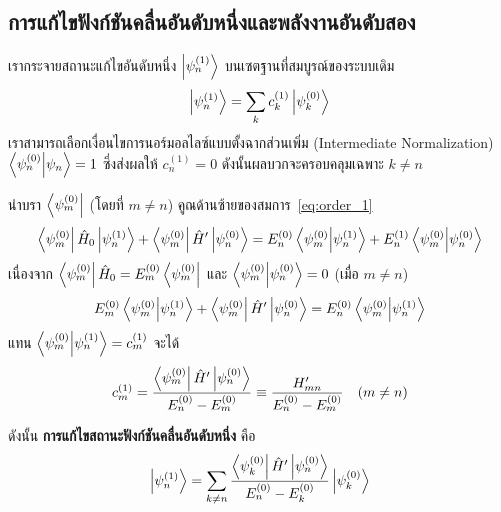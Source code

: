 \subsection{การแก้ไขฟังก์ชันคลื่นอันดับหนึ่งและพลังงานอันดับสอง}
เรากระจายสถานะแก้ไขอันดับหนึ่ง $\ket{\psi_n^{(1)}}$ บนเซตฐานที่สมบูรณ์ของระบบเดิม
\begin{equation}
\ket{\psi_n^{(1)}} = \sum_k c_k^{(1)} \ket{\psi_k^{(0)}}
\label{eq:psi1_expansion}
\end{equation}
เราสามารถเลือกเงื่อนไขการนอร์มอลไลซ์แบบตั้งฉากส่วนเพิ่ม (Intermediate Normalization) $\braket{\psi_n^{(0)}}{\psi_n} = 1$ ซึ่งส่งผลให้ $c_n^{(1)} = 0$ ดังนั้นผลบวกจะครอบคลุมเฉพาะ $k \neq n$

นำบรา $\bra{\psi_m^{(0)}}$ (โดยที่ $m \neq n$) คูณด้านซ้ายของสมการ~\eqref{eq:order_1}
\begin{equation}
\bra{\psi_m^{(0)}} \hat{H}_0 \ket{\psi_n^{(1)}} + \bra{\psi_m^{(0)}} \hat{H}' \ket{\psi_n^{(0)}} = E_n^{(0)} \braket{\psi_m^{(0)}}{\psi_n^{(1)}} + E_n^{(1)} \braket{\psi_m^{(0)}}{\psi_n^{(0)}}
\end{equation}
เนื่องจาก $\bra{\psi_m^{(0)}}\hat{H}_0 = E_m^{(0)}\bra{\psi_m^{(0)}}$ และ $\braket{\psi_m^{(0)}}{\psi_n^{(0)}} = 0$ (เมื่อ $m \neq n$)
\begin{equation}
E_m^{(0)} \braket{\psi_m^{(0)}}{\psi_n^{(1)}} + \bra{\psi_m^{(0)}} \hat{H}' \ket{\psi_n^{(0)}} = E_n^{(0)} \braket{\psi_m^{(0)}}{\psi_n^{(1)}}
\end{equation}
แทน $\braket{\psi_m^{(0)}}{\psi_n^{(1)}} = c_m^{(1)}$ จะได้
\begin{equation}
c_m^{(1)} = \frac{\bra{\psi_m^{(0)}} \hat{H}' \ket{\psi_n^{(0)}}}{E_n^{(0)} - E_m^{(0)}} \equiv \frac{H'_{mn}}{E_n^{(0)} - E_m^{(0)}} \quad (m \neq n)
\end{equation}

ดังนั้น \textbf{การแก้ไขสถานะฟังก์ชันคลื่นอันดับหนึ่ง} คือ
\begin{equation}
\ket{\psi_n^{(1)}} = \sum_{k \neq n} \frac{\bra{\psi_k^{(0)}} \hat{H}' \ket{\psi_n^{(0)}}}{E_n^{(0)} - E_k^{(0)}} \ket{\psi_k^{(0)}}
\label{eq:first_order_state_formula}
\end{equation}

